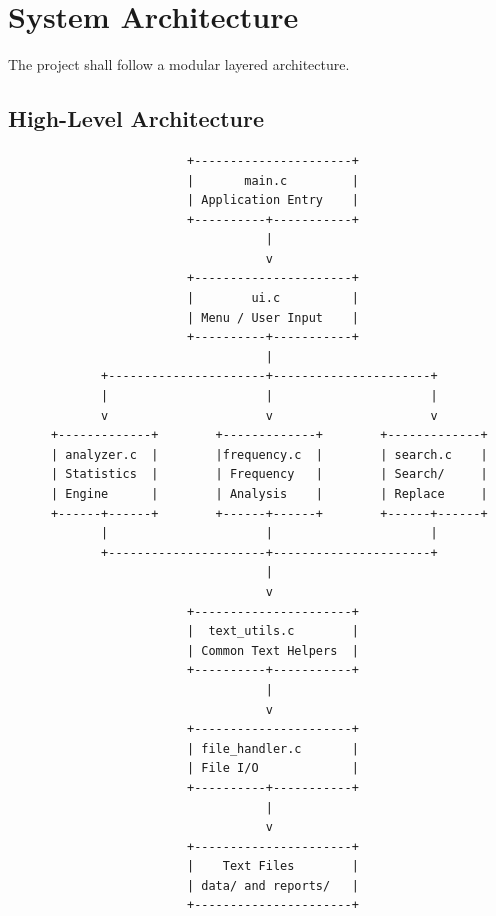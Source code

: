 \documentclass[12pt,a4paper]{article}
\begin{document}
\section{System Architecture}

The project shall follow a modular layered architecture.

\subsection{High-Level Architecture}

\begin{verbatim}
                         +----------------------+
                         |       main.c         |
                         | Application Entry    |
                         +----------+-----------+
                                    |
                                    v
                         +----------------------+
                         |        ui.c          |
                         | Menu / User Input    |
                         +----------+-----------+
                                    |
             +----------------------+----------------------+
             |                      |                      |
             v                      v                      v
      +-------------+        +-------------+        +-------------+
      | analyzer.c  |        |frequency.c  |        | search.c    |
      | Statistics  |        | Frequency   |        | Search/     |
      | Engine      |        | Analysis    |        | Replace     |
      +------+------+        +------+------+        +------+------+
             |                      |                      |
             +----------------------+----------------------+
                                    |
                                    v
                         +----------------------+
                         |  text_utils.c        |
                         | Common Text Helpers  |
                         +----------+-----------+
                                    |
                                    v
                         +----------------------+
                         | file_handler.c       |
                         | File I/O             |
                         +----------+-----------+
                                    |
                                    v
                         +----------------------+
                         |    Text Files        |
                         | data/ and reports/   |
                         +----------------------+
\end{verbatim}
\end{document}
